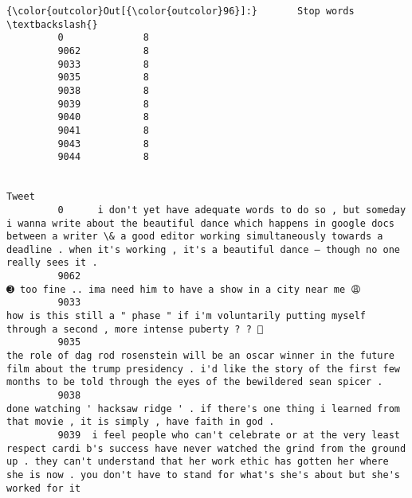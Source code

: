 \documentclass[11pt]{article}
\begin{document}
\begin{Verbatim}[commandchars=\\\{\}]
{\color{outcolor}Out[{\color{outcolor}96}]:}       Stop words  \textbackslash{}
         0              8   
         9062           8   
         9033           8   
         9035           8   
         9038           8   
         9039           8   
         9040           8   
         9041           8   
         9043           8   
         9044           8   
         
                                                                                                                                                                                                                                                                                               Tweet  
         0      i don't yet have adequate words to do so , but someday i wanna write about the beautiful dance which happens in google docs between a writer \& a good editor working simultaneously towards a deadline . when it's working , it's a beautiful dance — though no one really sees it .  
         9062                                                                                                                                                                                                                          ➌ too fine .. ima need him to have a show in a city near me 😩  
         9033                                                                                                                                                                          how is this still a " phase " if i'm voluntarily putting myself through a second , more intense puberty ? ? 🤔  
         9035                                                                          the role of dag rod rosenstein will be an oscar winner in the future film about the trump presidency . i'd like the story of the first few months to be told through the eyes of the bewildered sean spicer .  
         9038                                                                                                                                                                  done watching ' hacksaw ridge ' . if there's one thing i learned from that movie , it is simply , have faith in god .  
         9039  i feel people who can't celebrate or at the very least respect cardi b's success have never watched the grind from the ground up . they can't understand that her work ethic has gotten her where she is now . you don't have to stand for what's she's about but she's worked for it  

\end{Verbatim}
\end{document}
